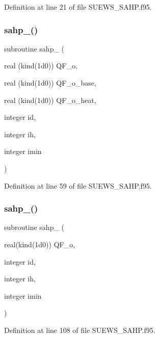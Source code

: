 Definition at line 21 of file S\+U\+E\+W\+S\+\_\+\+S\+A\+H\+P.\+f95.

\mbox{\label{_s_u_e_w_s___s_a_h_p_8f95_aee8fa1098c2995bf57f8bc65e5be7ed2}} 
\subsubsection{\texorpdfstring{sahp\+\_()}{sahp\_2()}}
{\footnotesize\ttfamily subroutine sahp\+\_ (\begin{DoxyParamCaption}\item[{real (kind(1d0))}]{Q\+F\+\_\+o,  }\item[{real (kind(1d0))}]{Q\+F\+\_\+o\+\_\+base,  }\item[{real (kind(1d0))}]{Q\+F\+\_\+o\+\_\+heat,  }\item[{integer}]{id,  }\item[{integer}]{ih,  }\item[{integer}]{imin }\end{DoxyParamCaption})}



Definition at line 59 of file S\+U\+E\+W\+S\+\_\+\+S\+A\+H\+P.\+f95.

\mbox{\label{_s_u_e_w_s___s_a_h_p_8f95_a2afb7b9da3c248277f05791a04feb468}} 
\subsubsection{\texorpdfstring{sahp\+\_()}{sahp\_3()}}
{\footnotesize\ttfamily subroutine sahp\+\_ (\begin{DoxyParamCaption}\item[{real(kind(1d0))}]{Q\+F\+\_\+o,  }\item[{integer}]{id,  }\item[{integer}]{ih,  }\item[{integer}]{imin }\end{DoxyParamCaption})}



Definition at line 108 of file S\+U\+E\+W\+S\+\_\+\+S\+A\+H\+P.\+f95.

